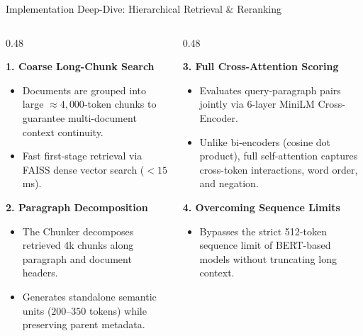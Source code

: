 \documentclass[10pt,aspectratio=169]{beamer}
\begin{document}
\begin{frame}{Implementation Deep-Dive: Hierarchical Retrieval \& Reranking}
    \begin{columns}[onlytextwidth,T]
        \begin{column}{0.48\textwidth}
            \begin{block}{\textbf{1. Coarse Long-Chunk Search}}
                \begin{itemize}
                    \item Documents are grouped into large $\approx 4,000$-token chunks to guarantee multi-document context continuity.
                    \item Fast first-stage retrieval via FAISS dense vector search ($<15$ ms).
                \end{itemize}
            \end{block}
            
            \begin{block}{\textbf{2. Paragraph Decomposition}}
                \begin{itemize}
                    \item The Chunker decomposes retrieved 4k chunks along paragraph and document headers.
                    \item Generates standalone semantic units ($200$--$350$ tokens) while preserving parent metadata.
                \end{itemize}
            \end{block}
        \end{column}
        
        \begin{column}{0.48\textwidth}
            \begin{block}{\textbf{3. Full Cross-Attention Scoring}}
                \begin{itemize}
                    \item Evaluates query-paragraph pairs jointly via 6-layer MiniLM Cross-Encoder.
                    \item Unlike bi-encoders (cosine dot product), full self-attention captures cross-token interactions, word order, and negation.
                \end{itemize}
            \end{block}
            
            \begin{block}{\textbf{4. Overcoming Sequence Limits}}
                \begin{itemize}
                    \item Bypasses the strict 512-token sequence limit of BERT-based models without truncating long context.
                \end{itemize}
            \end{block}
        \end{column}
    \end{columns}
\end{frame}
\end{document}
